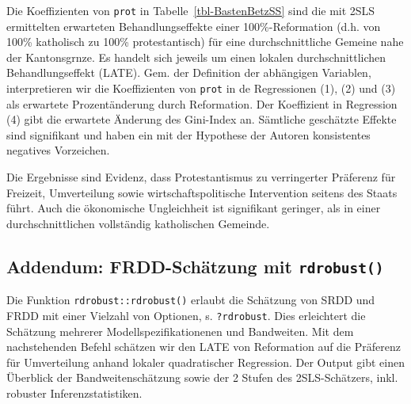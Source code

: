 \documentclass[
  a4paper,
  DIV=11,
  oneside]{scrreprt}
\newenvironment{Shaded}{\begin{snugshade}}{\end{snugshade}}
\newcommand{\AttributeTok}[1]{\textcolor[rgb]{0.40,0.45,0.13}{#1}}
\newcommand{\DecValTok}[1]{\textcolor[rgb]{0.68,0.00,0.00}{#1}}
\newcommand{\FunctionTok}[1]{\textcolor[rgb]{0.28,0.35,0.67}{#1}}
\newcommand{\NormalTok}[1]{\textcolor[rgb]{0.00,0.23,0.31}{#1}}
\newcommand{\OtherTok}[1]{\textcolor[rgb]{0.00,0.23,0.31}{#1}}
\newcommand{\SpecialCharTok}[1]{\textcolor[rgb]{0.37,0.37,0.37}{#1}}
\newcommand{\StringTok}[1]{\textcolor[rgb]{0.13,0.47,0.30}{#1}}
\begin{document}
Die Koeffizienten von \texttt{prot} in Tabelle~\ref{tbl-BastenBetzSS}
sind die mit 2SLS ermittelten erwarteten Behandlungseffekte einer
100\%-Reformation (d.h. von 100\% katholisch zu 100\% protestantisch)
für eine durchschnittliche Gemeine nahe der Kantonsgrnze. Es handelt
sich jeweils um einen lokalen durchschnittlichen Behandlungseffekt
(LATE). Gem. der Definition der abhängigen Variablen, interpretieren wir
die Koeffizienten von \texttt{prot} in de Regressionen (1), (2) und (3)
als erwartete Prozentänderung durch Reformation. Der Koeffizient in
Regression (4) gibt die erwartete Änderung des Gini-Index an. Sämtliche
geschätzte Effekte sind signifikant und haben ein mit der Hypothese der
Autoren konsistentes negatives Vorzeichen.

Die Ergebnisse sind Evidenz, dass Protestantismus zu verringerter
Präferenz für Freizeit, Umverteilung sowie wirtschaftspolitische
Intervention seitens des Staats führt. Auch die ökonomische Ungleichheit
ist signifikant geringer, als in einer durchschnittlichen vollständig
katholischen Gemeinde.

\hypertarget{addendum-frdd-schuxe4tzung-mit-rdrobust}{%
\subsection{\texorpdfstring{Addendum: FRDD-Schätzung mit
\texttt{rdrobust()}}{Addendum: FRDD-Schätzung mit rdrobust()}}\label{addendum-frdd-schuxe4tzung-mit-rdrobust}}

Die Funktion \texttt{rdrobust::rdrobust()} erlaubt die Schätzung von
SRDD und FRDD mit einer Vielzahl von Optionen, s. \texttt{?rdrobust}.
Dies erleichtert die Schätzung mehrerer Modellspezifikationenen und
Bandweiten. Mit dem nachstehenden Befehl schätzen wir den LATE von
Reformation auf die Präferenz für Umverteilung anhand lokaler
quadratischer Regression. Der Output gibt einen Überblick der
Bandweitenschätzung sowie der 2 Stufen des 2SLS-Schätzers, inkl.
robuster Inferenzstatistiken.

\begin{Shaded}
\end{Shaded}
\end{document}
